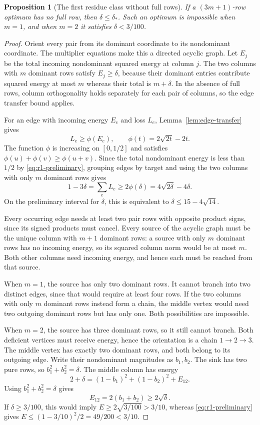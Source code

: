 \documentclass[11pt]{article}
\numberwithin{equation}{section}
\newtheorem{proposition}[proposition]{Proposition}
\theoremstyle{definition}
\theoremstyle{definition}
\begin{document}
\begin{proposition}[The first residue class without full rows]
\label{prop:r1-no-full}
If a $(3m+1)$-row optimum has no full row, then $\delta\le\delta_*$.
Such an optimum is impossible when $m=1$, and when $m=2$ it satisfies
$\delta<3/100$.
\end{proposition}
\begin{proof}
Orient every pair from its dominant coordinate to its nondominant
coordinate.  The multiplier equations make this a directed acyclic
graph.  Let $E_j$ be the total incoming nondominant squared energy at
column $j$.  The two columns with $m$ dominant rows satisfy
$E_j\ge\delta$, because their dominant entries contribute squared
energy at most $m$ whereas their total is $m+\delta$.
In the absence of full rows, column orthogonality holds separately
for each pair of columns, so the edge transfer bound applies.

For an edge with incoming energy $E_e$ and loss $L_e$, Lemma~\ref{lem:edge-transfer} gives
\[
 L_e\ge\phi(E_e),\qquad
 \phi(t)=2\sqrt{2t}-2t.
\]
The function $\phi$ is increasing on $[0,1/2]$ and satisfies
$\phi(u)+\phi(v)\ge\phi(u+v)$.  Since the total nondominant energy is
less than $1/2$ by \eqref{eq:r1-preliminary}, grouping edges by target
and using the two columns with only $m$ dominant rows gives
\[
 1-3\delta=\sum_e L_e
       \ge2\phi(\delta)=4\sqrt{2\delta}-4\delta.
\]
On the preliminary interval for $\delta$, this is equivalent to
$\delta\le15-4\sqrt{14}$.

Every occurring edge needs at least two pair rows with opposite
product signs, since its signed products must cancel.  Every source
of the acyclic graph must be the unique column with $m+1$ dominant
rows: a source with only $m$ dominant rows has no incoming energy,
so its squared column norm would be at most $m$.  Both other columns
need incoming energy, and hence each must be reached from that source.

When $m=1$, the source has only two dominant rows.  It cannot branch
into two distinct edges, since that would require at least four rows.
If the two columns with only $m$ dominant rows instead form a chain,
the middle vertex
would need two outgoing dominant rows but has only one.  Both
possibilities are impossible.

When $m=2$, the source has three dominant rows, so it still cannot
branch.  Both deficient vertices must receive energy, hence the
orientation is a chain $1\to2\to3$.  The middle vertex has exactly
two dominant rows, and both belong to its outgoing edge.  Write their
nondominant magnitudes as $b_1,b_2$.  The sink has two pure rows,
so $b_1^2+b_2^2=\delta$.  The middle column has energy
\[
 2+\delta=(1-b_1)^2+(1-b_2)^2+E_{12}.
\]
Using $b_1^2+b_2^2=\delta$ gives
\[
 E_{12}=2(b_1+b_2)\ge2\sqrt\delta.
\]
If $\delta\ge3/100$, this would imply
$E\ge2\sqrt{3/100}>3/10$, whereas
\eqref{eq:r1-preliminary} gives
$E\le(1-3/10)^2/2=49/200<3/10$.
\end{proof}
\end{document}
